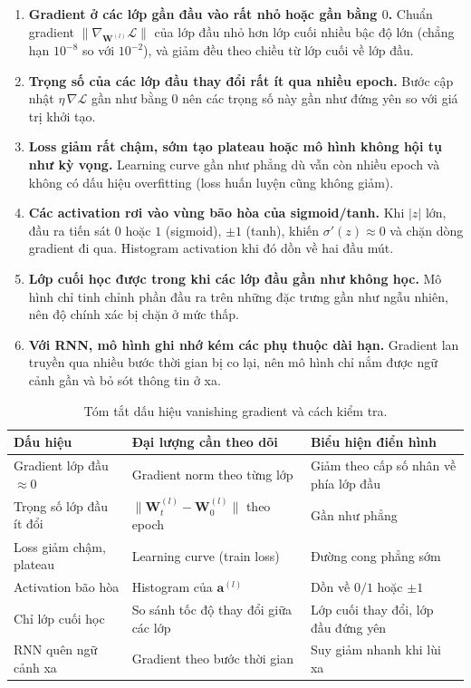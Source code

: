 \documentclass[12pt]{article}
\begin{document}
\begin{enumerate}
    \item \textbf{Gradient ở các lớp gần đầu vào rất nhỏ hoặc gần bằng $0$.} Chuẩn gradient $\lVert\nabla_{\mathbf{W}^{(l)}}\mathcal{L}\rVert$ của lớp đầu nhỏ hơn lớp cuối nhiều bậc độ lớn (chẳng hạn $10^{-8}$ so với $10^{-2}$), và giảm đều theo chiều từ lớp cuối về lớp đầu.
    \item \textbf{Trọng số của các lớp đầu thay đổi rất ít qua nhiều epoch.} Bước cập nhật $\eta\,\nabla\mathcal{L}$ gần như bằng $0$ nên các trọng số này gần như đứng yên so với giá trị khởi tạo.
    \item \textbf{Loss giảm rất chậm, sớm tạo plateau hoặc mô hình không hội tụ như kỳ vọng.} Learning curve gần như phẳng dù vẫn còn nhiều epoch và không có dấu hiệu overfitting (loss huấn luyện cũng không giảm).
    \item \textbf{Các activation rơi vào vùng bão hòa của sigmoid/tanh.} Khi $|z|$ lớn, đầu ra tiến sát $0$ hoặc $1$ (sigmoid), $\pm1$ (tanh), khiến $\sigma'(z)\approx 0$ và chặn dòng gradient đi qua. Histogram activation khi đó dồn về hai đầu mút.
    \item \textbf{Lớp cuối học được trong khi các lớp đầu gần như không học.} Mô hình chỉ tinh chỉnh phần đầu ra trên những đặc trưng gần như ngẫu nhiên, nên độ chính xác bị chặn ở mức thấp.
    \item \textbf{Với RNN, mô hình ghi nhớ kém các phụ thuộc dài hạn.} Gradient lan truyền qua nhiều bước thời gian bị co lại, nên mô hình chỉ nắm được ngữ cảnh gần và bỏ sót thông tin ở xa.
\end{enumerate}

\begin{table}[htbp]
    \centering
    \caption{Tóm tắt dấu hiệu vanishing gradient và cách kiểm tra.}
    \label{tab:signs}
    \renewcommand{\arraystretch}{1.25}
    \begin{tabularx}{\textwidth}{@{}>{\raggedright\arraybackslash}p{} >{\raggedright\arraybackslash}X >{\raggedright\arraybackslash}X@{}}
        \toprule
        Dấu hiệu & Đại lượng cần theo dõi & Biểu hiện điển hình \\
        \midrule
        Gradient lớp đầu $\approx 0$ & Gradient norm theo từng lớp & Giảm theo cấp số nhân về phía lớp đầu \\
        Trọng số lớp đầu ít đổi & $\lVert\mathbf{W}^{(l)}_t-\mathbf{W}^{(l)}_0\rVert$ theo epoch & Gần như phẳng \\
        Loss giảm chậm, plateau & Learning curve (train loss) & Đường cong phẳng sớm \\
        Activation bão hòa & Histogram của $\mathbf{a}^{(l)}$ & Dồn về $0/1$ hoặc $\pm1$ \\
        Chỉ lớp cuối học & So sánh tốc độ thay đổi giữa các lớp & Lớp cuối thay đổi, lớp đầu đứng yên \\
        RNN quên ngữ cảnh xa & Gradient theo bước thời gian & Suy giảm nhanh khi lùi xa \\
        \bottomrule
    \end{tabularx}
\end{table}
\end{document}
